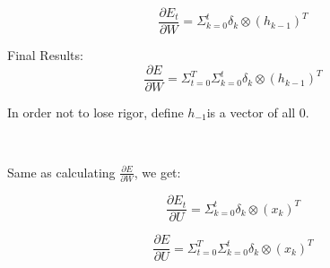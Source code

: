 \documentclass[oneside,solution]{seu-ml-assign}
\begin{document}
\begin{equation}\frac{\partial E_t}{\partial W}=\Sigma_{k=0}^t\delta_k\otimes(h_{k-1})^T\end{equation}


Final Results:
\begin{equation}\frac{\partial E}{\partial W}=\Sigma_{t=0}^T\Sigma_{k=0}^t\delta_k\otimes(h_{k-1})^T\end{equation}


In order not to lose rigor, define $h_{-1}$is a vector of all 0.


\

Same as calculating $\frac{\partial E }{ \partial W }$, we get:

\begin{equation}\frac{\partial E_t}{\partial U}=\Sigma_{k=0}^{t}\delta_{k}\otimes(x_{k})^{T}\end{equation}


\begin{equation}\frac{\partial E}{\partial U}=\Sigma_{t=0}^T\Sigma_{k=0}^t\delta_k\otimes(x_k)^T\end{equation}

\vspace{2mm}
\end{document}
